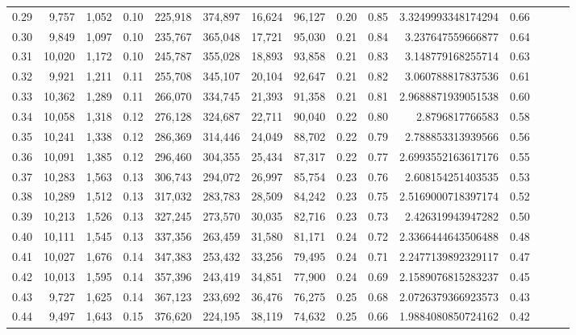\begin{tabular}{rrrrrrrrrrrrrrr}
0.29 &   9,757 &  1,052 &  0.10 &  225,918 &  374,897 &   16,624 &   96,127 &  0.20 &  0.85 &    3.3249993348174294 &      0.66 \\
0.30 &   9,849 &  1,097 &  0.10 &  235,767 &  365,048 &   17,721 &   95,030 &  0.21 &  0.84 &     3.237647559666877 &      0.64 \\
0.31 &  10,020 &  1,172 &  0.10 &  245,787 &  355,028 &   18,893 &   93,858 &  0.21 &  0.83 &     3.148779168255714 &      0.63 \\
0.32 &   9,921 &  1,211 &  0.11 &  255,708 &  345,107 &   20,104 &   92,647 &  0.21 &  0.82 &     3.060788817837536 &      0.61 \\
0.33 &  10,362 &  1,289 &  0.11 &  266,070 &  334,745 &   21,393 &   91,358 &  0.21 &  0.81 &    2.9688871939051538 &      0.60 \\
0.34 &  10,058 &  1,318 &  0.12 &  276,128 &  324,687 &   22,711 &   90,040 &  0.22 &  0.80 &       2.8796817766583 &      0.58 \\
0.35 &  10,241 &  1,338 &  0.12 &  286,369 &  314,446 &   24,049 &   88,702 &  0.22 &  0.79 &     2.788853313939566 &      0.56 \\
0.36 &  10,091 &  1,385 &  0.12 &  296,460 &  304,355 &   25,434 &   87,317 &  0.22 &  0.77 &    2.6993552163617176 &      0.55 \\
0.37 &  10,283 &  1,563 &  0.13 &  306,743 &  294,072 &   26,997 &   85,754 &  0.23 &  0.76 &     2.608154251403535 &      0.53 \\
0.38 &  10,289 &  1,512 &  0.13 &  317,032 &  283,783 &   28,509 &   84,242 &  0.23 &  0.75 &    2.5169000718397174 &      0.52 \\
0.39 &  10,213 &  1,526 &  0.13 &  327,245 &  273,570 &   30,035 &   82,716 &  0.23 &  0.73 &     2.426319943947282 &      0.50 \\
0.40 &  10,111 &  1,545 &  0.13 &  337,356 &  263,459 &   31,580 &   81,171 &  0.24 &  0.72 &    2.3366444643506488 &      0.48 \\
0.41 &  10,027 &  1,676 &  0.14 &  347,383 &  253,432 &   33,256 &   79,495 &  0.24 &  0.71 &    2.2477139892329117 &      0.47 \\
0.42 &  10,013 &  1,595 &  0.14 &  357,396 &  243,419 &   34,851 &   77,900 &  0.24 &  0.69 &    2.1589076815283237 &      0.45 \\
0.43 &   9,727 &  1,625 &  0.14 &  367,123 &  233,692 &   36,476 &   76,275 &  0.25 &  0.68 &    2.0726379366923573 &      0.43 \\
0.44 &   9,497 &  1,643 &  0.15 &  376,620 &  224,195 &   38,119 &   74,632 &  0.25 &  0.66 &    1.9884080850724162 &      0.42 \\

\end{tabular}
